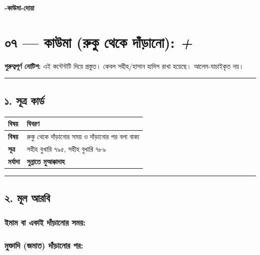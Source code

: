 

\begin{center}{\Large\bfseries\color{emerald} -কাউমা-দোয়া}\end{center}
\vspace{1em}
\section*{০৭ — কাউমা (রুকু থেকে দাঁড়ানো): \textit{ +   }}

\begin{warnbox}
 \textbf{গুরুত্বপূর্ণ নোটিশ:} এই কন্টেন্টটি  দিয়ে প্রস্তুত। কেবল সহীহ/হাসান হাদিস রাখা হয়েছে। আলেম-যাচাইকৃত নয়।
\end{warnbox}

\medskip\hrule\medskip

\subsection*{১. সূত্র কার্ড}

\begin{table}[h]\centering\small
\begin{tabular}{ll}
বিষয় & বিবরণ \\
\hline
\textbf{বিষয়} & রুকু থেকে দাঁড়ানোর সময় ও দাঁড়ানোর পর বলা বাক্য \\
\textbf{সূত্র} & সহীহ বুখারি ৭৯৫, সহীহ বুখারি ৭৮৯ \\
\textbf{মর্যাদা} & \textbf{সুন্নাতে মুআক্কাদাহ} \\
\hline
\end{tabular}
\end{table}

\medskip\hrule\medskip

\subsection*{২. মূল আরবি}

\subsubsection*{\textbf{ইমাম বা একাই দাঁড়ানোর সময়:}}
\begin{center}\end{center}

\subsubsection*{\textbf{মুক্তাদি (জমাত) দাঁড়ানোর পর:}}
\begin{center}\end{center}

